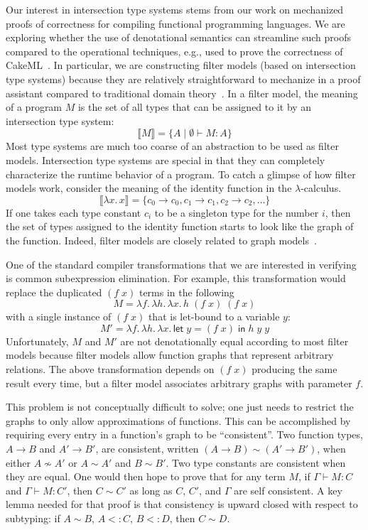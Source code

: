\documentclass{article}
\begin{document}
Our interest in intersection type systems stems from our work on
mechanized proofs of correctness for compiling functional programming
languages. We are exploring whether the use of denotational semantics
can streamline such proofs compared to the operational techniques,
e.g., used to prove the correctness of
CakeML~\citep{Kumar:2014aa,Owens:2017aa}. In particular, we are
constructing filter models (based on intersection type systems)
because they are relatively straightforward to mechanize in a proof
assistant compared to traditional domain
theory~\citep{Benton:2009ab,Dockins:2014aa}.  In a filter model, the
meaning of a program $M$ is the set of all types that can be assigned
to it by an intersection type system:
\[
   \llbracket M \rrbracket = \{ A \mid \emptyset \vdash M : A \}
\]
Most type systems are much too coarse of an abstraction to be used as
filter models. Intersection type systems are special in that they can
completely characterize the runtime behavior of a program.  To catch a
glimpse of how filter models work, consider the meaning of the
identity function in the $\lambda$-calculus.
\[
  \llbracket \lambda x.\, x \rrbracket =
      \{ c_0 \to c_0, c_1 \to c_1, c_2 \to c_2, \ldots \}
\]
If one takes each type constant $c_i$ to be a singleton type for the
number $i$, then the set of types assigned to the identity function
starts to look like the graph of the function. Indeed, filter models
are closely related to graph
models~\citep{Scott:1976lq,Engeler:1981aa,Plotkin:1993ab}.

One of the standard compiler transformations that we are interested in
verifying is common subexpression elimination. For example, this
transformation would replace the duplicated $(f \; x)$ terms in the
following
\[
  M = \lambda f.\, \lambda h.\, \lambda x.\, h \; (f \; x) \; (f \; x)
\]
with a single instance of $(f\;x)$ that is let-bound to a variable $y$:
\[
M' = \lambda f.\, \lambda h.\, \lambda x.\,
\mathsf{let}\; y = (f \; x) \;\mathsf{in}\;
h \; y \; y
\]
Unfortunately, $M$ and $M'$ are not denotationally equal according to
most filter models because filter models allow function graphs that
represent arbitrary relations. The above transformation depends on $(f
\; x)$ producing the same result every time, but a filter model
associates arbitrary graphs with parameter $f$.

This problem is not conceptually difficult to solve; one just needs to
restrict the graphs to only allow approximations of functions. This
can be accomplished by requiring every entry in a function's graph to
be ``consistent''. Two function types, $A \to B$ and $A' \to B'$, are
consistent, written $(A \to B) \sim (A' \to B')$, when either $A
\not\sim A'$ or $A \sim A'$ and $B \sim B'$. Two type constants are
consistent when they are equal. One would then hope to prove that for
any term $M$, if $\Gamma \vdash M : C$ and $\Gamma \vdash M : C'$,
then $C \sim C'$ as long as $C$, $C'$, and $\Gamma$ are self
consistent. A key lemma needed for that proof is that consistency is
upward closed with respect to subtyping: if $A \sim B$, $A <: C$, $B
<: D$, then $C \sim D$.
\end{document}
